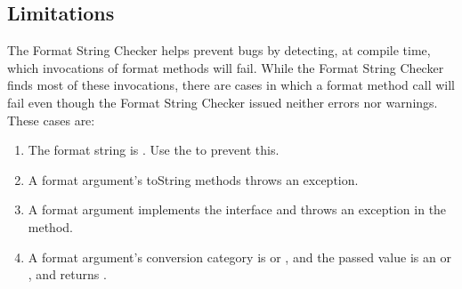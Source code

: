 % 
% 

\subsection{Limitations}

The Format String Checker helps prevent bugs by detecting, at compile time,
which invocations of format methods will fail. While the Format String Checker
finds most of these invocations, there are cases in which a format method call
will fail even though the Format String Checker issued neither errors nor
warnings. These cases are:

\begin{enumerate}
\item The format string is . Use the  to prevent this.
\item A format argument's toString methods throws an exception.
\item A format argument implements the  interface and throws an
    exception in the  method.
\item A format argument's conversion category is  or ,
    and the passed value is an  or , and 
     returns .
\end{enumerate}

